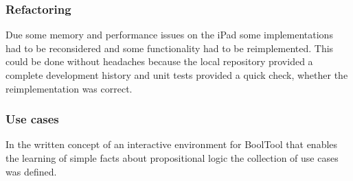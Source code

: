 \subsubsection{Refactoring}

Due some memory and performance issues on the iPad 
some implementations had to be reconsidered 
and some functionality had to be reimplemented.
This could be done without headaches because 
the local repository provided a complete development history 
and unit tests provided a quick check, whether the reimplementation was correct.


\subsubsection{Use cases}

In the written concept of an interactive environment for BoolTool that enables the learning  of simple facts about propositional logic the collection of use cases was defined.

